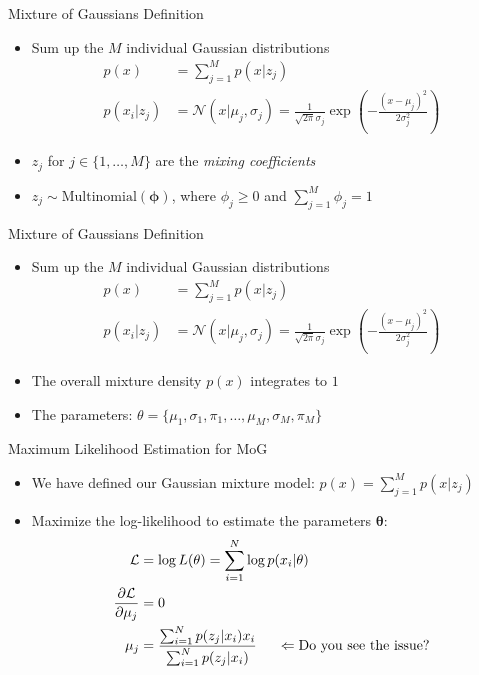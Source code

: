 \begin{frame}{Mixture of Gaussians Definition}{}
	\begin{itemize}
		\item Sum up the $M$ individual Gaussian distributions
		\begin{align}
			p(x) &= \sum_{j=1}^M p(x|z_j)\\
			p(x_i|z_j) &= \mathcal{N}(x|\mu_j, \sigma_j) = \frac{1}{\sqrt{2\pi}\sigma_j} \exp\left(-\frac{(x - \mu_j)^2}{2\sigma_j^2}\right)
		\end{align}
		\item $z_j$ for $j \in \{1, \dots, M\}$ are the \textit{mixing coefficients}
		\item $z_j \sim \text{Multinomial}(\bm{\phi})$, where $\phi_j \ge 0$ and $\sum_{j=1}^M \phi_j = 1$
	\end{itemize}
\end{frame}

\begin{frame}{Mixture of Gaussians Definition}{}
	\begin{itemize}
		\item Sum up the $M$ individual Gaussian distributions
		\begin{align}
			p(x) &= \sum_{j=1}^M p(x|z_j)\\
			p(x_i|z_j) &= \mathcal{N}(x|\mu_j, \sigma_j) = \frac{1}{\sqrt{2\pi}\sigma_j} \exp\left(-\frac{(x - \mu_j)^2}{2\sigma_j^2}\right)
		\end{align}
		\item The overall mixture density $p(x)$ integrates to $1$
		\item The parameters: $\theta = \{\mu_1, \sigma_1, \pi_1, \dots, \mu_M, \sigma_M, \pi_M\}$
		\begin{boxBlueNoFrame}
		\end{boxBlueNoFrame}
	\end{itemize}
\end{frame}

\begin{frame}{Maximum Likelihood Estimation for MoG}{}
	\begin{itemize}
		\item We have defined our Gaussian mixture model: $p(x) = \sum_{j=1}^M p(x|z_j)$
		\item Maximize the log-likelihood to estimate the parameters $\bm{\theta}$:
		\begin{align}
			\mathcal{L} &= \log L(\theta) = \sum_{i=1}^N \log p(x_i|\theta)\\
			\frac{\partial \mathcal{L}}{\partial \mu_j} &= 0\\
			\mu_j &= \frac{\sum_{i=1}^N p(z_j|x_i) x_i}{\sum_{i=1}^N p(z_j|x_i)}\hspace{0.5cm} \Leftarrow \text{Do you see the issue?}
		\end{align}
	\end{itemize}
\end{frame}

